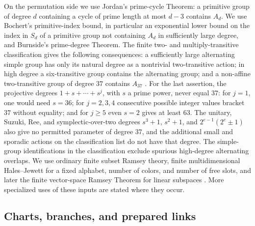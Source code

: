 On the permutation side we use Jordan's prime-cycle Theorem: a primitive
group of degree $d$ containing a cycle of prime length at most $d-3$
contains $A_d$. We use Bochert's primitive-index bound, in particular an
exponential lower bound on the index in $S_d$ of a primitive group not
containing $A_d$ in sufficiently large degree, and Burnside's prime-degree
Theorem. The finite two- and multiply-transitive classification gives the
following consequences: a sufficiently large alternating simple group has
only its natural degree as a nontrivial two-transitive action; in high
degree a six-transitive group contains the alternating group; and a
non-affine two-transitive group of degree $37$ contains $A_{37}$
\cite{DixonMortimer1996}.
For the last assertion, the projective degrees $1+s+\cdots+s^j$, with $s$ a
prime power, never equal $37$: for $j=1$, one would need $s=36$; for
$j=2,3,4$ consecutive possible integer values bracket $37$ without equality;
and for $j\ge5$ even $s=2$ gives at least $63$. The unitary, Suzuki, Ree, and
symplectic-over-two degrees $s^3+1$, $s^2+1$, and
$2^{e-1}(2^e\pm1)$ also give no permitted parameter of degree $37$, and the
additional small and sporadic actions on the classification list do not
have that degree. The simple-group identifications in the classification
exclude spurious high-degree alternating overlaps.
We use ordinary finite subset Ramsey theory, finite multidimensional
Hales--Jewett for a fixed alphabet, number of colors, and number of free
slots, and later the finite vector-space Ramsey Theorem for linear
subspaces \cite{Ramsey1930,HalesJewett1963,GrahamLeebRothschild1972,GrahamLeebRothschild1973}.
More specialized uses of these inputs are stated where they occur.

\subsection{Charts, branches, and prepared links}

